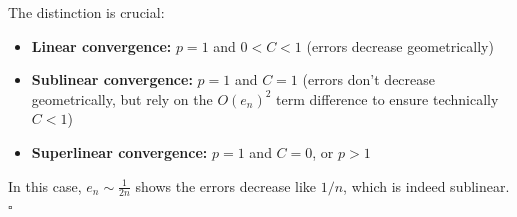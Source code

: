 The distinction is crucial:
\begin{itemize}
\item \textbf{Linear convergence:} $p = 1$ and $0 < C < 1$ (errors decrease geometrically)
\item \textbf{Sublinear convergence:} $p = 1$ and $C = 1$ (errors don't decrease geometrically, but rely on the $O(e_n)^2$ term difference to ensure technically $C < 1$)
\item \textbf{Superlinear convergence:} $p = 1$ and $C = 0$, or $p > 1$
\end{itemize}

In this case, $e_n \sim \frac{1}{2n}$ shows the errors decrease like $1/n$, which is indeed sublinear. $\square$